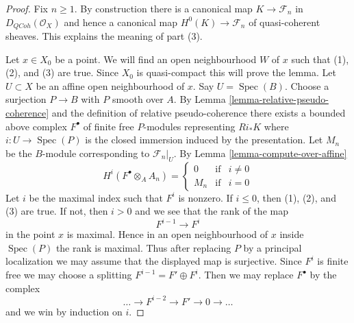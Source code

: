 \documentclass[10pt,a4paper]{amsart}
\theoremstyle{plain}
\theoremstyle{definition}
\theoremstyle{remark}
\numberwithin{equation}{subsection}
\def\Spec{\mathop{\mathrm{Spec}}}
\def\QCoh{\mathit{QCoh}}
\begin{document}
\begin{proof}
Fix $n \geq 1$. By construction there is a canonical map
$K \to \mathcal{F}_n$ in $D_\QCoh(\mathcal{O}_X)$
and hence a canonical map $H^0(K) \to \mathcal{F}_n$
of quasi-coherent sheaves. This explains the meaning of part (3).

\medskip\noindent
Let $x \in X_0$ be a point.
We will find an open neighbourhood $W$
of $x$ such that (1), (2), and (3) are true. Since $X_0$ is quasi-compact
this will prove the lemma. Let $U \subset X$ be an affine open
neighbourhood of $x$. Say $U = \Spec(B)$.
Choose a surjection $P \to B$ with $P$ smooth over $A$.
By Lemma \ref{lemma-relative-pseudo-coherence}
and the definition of relative pseudo-coherence
there exists a bounded above complex $F^\bullet$
of finite free $P$-modules representing
$Ri_*K$ where $i : U \to \Spec(P)$ is the closed
immersion induced by the presentation.
Let $M_n$ be the $B$-module corresponding to $\mathcal{F}_n|_U$.
By Lemma \ref{lemma-compute-over-affine}
$$
H^i(F^\bullet \otimes_A A_n) =
\left\{
\begin{matrix}
0 & \text{if} & i \not = 0 \\
M_n & \text{if} & i = 0
\end{matrix}
\right.
$$
Let $i$ be the maximal index such that $F^i$ is nonzero.
If $i \leq 0$, then (1), (2), and (3) are true.
If not, then $i > 0$ and we see that the rank of the map
$$
F^{i - 1} \to F^i
$$
in the point $x$ is maximal. Hence in an open neighbourhood
of $x$ inside $\Spec(P)$ the rank is maximal. Thus after replacing
$P$ by a principal localization we may assume that the displayed
map is surjective. Since $F^i$ is finite free we may choose
a splitting $F^{i - 1} = F' \oplus F^i$. Then we may
replace $F^\bullet$ by the complex
$$
\ldots \to F^{i - 2} \to F' \to 0 \to \ldots
$$
and we win by induction on $i$.
\end{proof}
\end{document}
